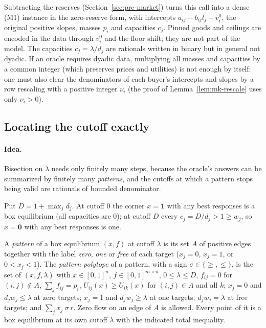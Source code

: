 Subtracting the reserves (Section~\ref{sec:pre-market}) turns this call into a dense (M1) instance in
the zero-reserve form, with intercepts $a_{ij}-b_{ij}l_j-v_i^0$, the original positive slopes, masses
$p_i$ and capacities $c_j$. Pinned goods and ceilings are encoded in the data through $v_i^0$ and the
floor shift; they are not part of the model. The capacities $c_j=\lambda/d_j$ are rationals written in
binary but in general not dyadic. If an oracle requires dyadic data, multiplying all masses and
capacities by a common integer (which preserves prices and utilities) is not enough by itself: one must
also clear the denominators of each buyer's intercepts and slopes by a row rescaling with a positive integer $\nu_i$ (the proof of Lemma~\ref{lem:mk-rescale} uses only $\nu_i>0$).

\subsection{Locating the cutoff exactly}

\paragraph{Idea.} Bisection on $\lambda$ needs only finitely many steps, because the oracle's answers
can be summarized by finitely many \emph{patterns}, and the cutoffs at which a pattern stops being
valid are rationals of bounded denominator.

Put $D=1+\max_jd_j$. At cutoff $0$ the corner $x=\mathbf1$ with any best responses is a box
equilibrium (all capacities are $0$); at cutoff $D$ every $c_j=D/d_j>1\ge w_j$, so $x=\mathbf0$ with any
best responses is one.

A \emph{pattern} of a box equilibrium $(x,f)$ at cutoff $\lambda$ is its set $A$ of positive edges
together with the label \emph{zero}, \emph{one} or \emph{free} of each target ($x_j=0$, $x_j=1$, or
$0<x_j<1$). The \emph{pattern polytope} of a pattern, with a sign $\sigma\in\{\ge,\le\}$, is the set of
$(x,f,\lambda)$ with $x\in[0,1]^n$, $f\in[0,1]^{m\times n}$, $0\le\lambda\le D$, $f_{ij}=0$ for
$(i,j)\notin A$, $\sum_jf_{ij}=p_i$, $U_{ij}(x)\ge U_{ik}(x)$ for $(i,j)\in A$ and all $k$; $x_j=0$ and
$d_jw_j\le\lambda$ at zero targets; $x_j=1$ and $d_jw_j\ge\lambda$ at one targets; $d_jw_j=\lambda$ at free
targets; and $\sum_jx_j\ \sigma\ r$. Zero flow on an edge of $A$ is allowed. Every point of it is a box
equilibrium at its own cutoff $\lambda$ with the indicated total inequality.

